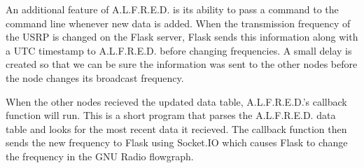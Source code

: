  An additional feature of A.L.F.R.E.D. is its ability to pass a command to the command line whenever new data is added. When the transmission frequency of the USRP is changed on the Flask server, Flask sends this information along with a UTC timestamp to A.L.F.R.E.D. before changing frequencies. A small delay is created so that we can be sure the information was sent to the other nodes before the node changes its broadcast frequency.  

 When the other nodes recieved the updated data table, A.L.F.R.E.D.'s callback function will run. This is a short program that parses the A.L.F.R.E.D. data table and looks for the most recent data it recieved. The callback function then sends the new frequency to Flask using Socket.IO which causes Flask to change the frequency in the GNU Radio flowgraph.   